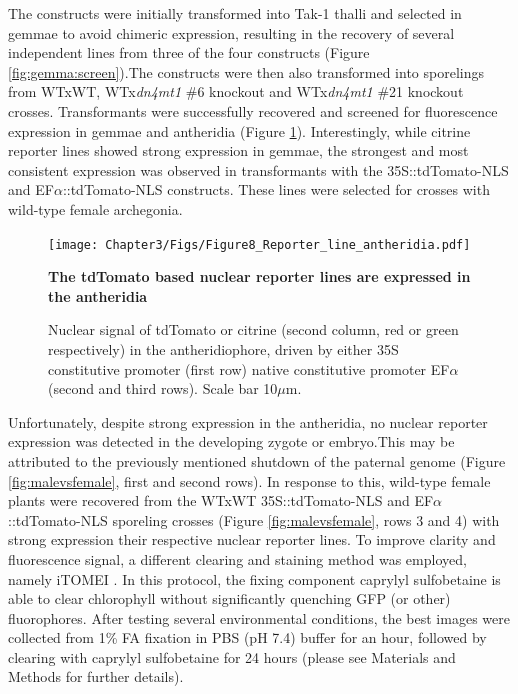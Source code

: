The constructs were initially transformed into Tak-1 thalli and selected in gemmae to avoid chimeric expression, resulting in the recovery of several independent lines from three of the four constructs (Figure \ref{fig:gemma:screen}).The constructs were then also transformed into sporelings from WTxWT, WTx\textit{dn4mt1} \#6 knockout and WTx\textit{dn4mt1} \#21 knockout crosses. Transformants were successfully recovered and screened for fluorescence expression in gemmae and antheridia (Figure \ref{fig:antheridia_screen}). Interestingly, while citrine reporter lines showed strong expression in gemmae, the strongest and most consistent expression was observed in transformants with the 35S::tdTomato-NLS and EF$\alpha$::tdTomato-NLS constructs. These lines were selected for crosses with wild-type female archegonia.

\begin{figure}[htbp!] 
\centering    
    \texttt{[image: Chapter3/Figs/Figure8\_Reporter\_line\_antheridia.pdf]}
\caption{\textbf{The tdTomato based nuclear reporter lines are expressed in the antheridia}}
\label{fig:antheridia_screen}
\captionsetup{font=small}
    \caption*{Nuclear signal of tdTomato or citrine (second column, red or green respectively) in the antheridiophore, driven by either 35S constitutive promoter (first row) native constitutive promoter EF$\alpha$ (second and third rows). Scale bar 10$\mu$m.}
\end{figure}

Unfortunately, despite strong expression in the antheridia, no nuclear reporter expression was detected in the developing zygote or embryo.This may be attributed to the previously mentioned shutdown of the paternal genome (Figure \ref{fig:malevsfemale}, first and second rows).  In response to this, wild-type female plants were recovered from the WTxWT 35S::tdTomato-NLS and  EF$\alpha$::tdTomato-NLS sporeling crosses (Figure \ref{fig:malevsfemale}, rows 3 and 4) with strong expression their respective nuclear reporter lines. To improve clarity and fluorescence signal, a different clearing and staining method was employed, namely iTOMEI \citep{RN279}. In this protocol, the fixing component caprylyl sulfobetaine is able to clear chlorophyll without significantly quenching GFP (or other) fluorophores. After testing several environmental conditions, the best images were collected from 1\% FA fixation in PBS (pH 7.4) buffer for an hour, followed by clearing with caprylyl sulfobetaine for 24 hours (please see Materials and Methods for further details).


